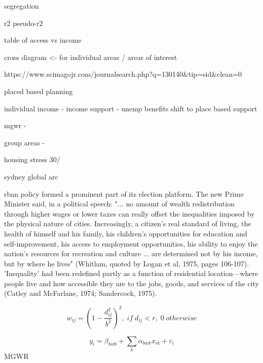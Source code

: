 segregation

r2
pseudo-r2

table of access vs income

cross diagram <- for individual areas / areas of interest

https://www.scimagojr.com/journalsearch.php?q=130140&tip=sid&clean=0

placed based planning

individual income - income support - unemp benefits
shift to place based support

mgwr - 

group areas -

housing stress 30/%

sydney global arc

rban policy formed a prominent part of its election platform. The new Prime Minister said, in a political speech: "... no amount of wealth redistribution through higher wages or lower taxes can really offset the inequalities imposed by the physical nature of cities. Increasingly, a citizen's real standard of living, the health of himself and his family, his children's opportunities for education and self-improvement, his access to employment opportunities, his ability to enjoy the nation's resources for recreation and culture ... are determined not by his income, but by where he lives" (Whitlam, quoted by Logan et al, 1975, pages 106-107). 'Inequality' had been redefined partly as a function of residential location—where people live and how
accessible they are to the jobs, goods, and services of the city (Catley and McFarlane,
1974; Sandercock, 1975). 


\begin{equation}
    w_{ij} =\left (1 - \frac{d_{ij}^2}{b^{2}}  \right )^{2},\; if \; d_{ij} < r, \; 0 \; otherwise
\end{equation}

\begin{equation}
y_{i} = \beta_{bw0} + \sum_{k} \alpha_{bwk} x_{ik} + \varepsilon_{i}
\end{equation}
MGWR

